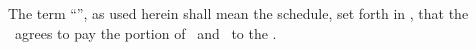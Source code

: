 The term “\rentinstallmentdates”, as used herein shall mean the schedule, set forth in \exhibitC, that the \lessee\ agrees to pay the portion of \annualcashrent\ and \bonusrent\ to the \lessor.
